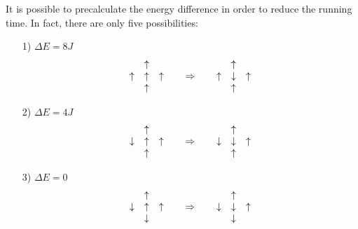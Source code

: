 \documentclass[%
preprint,
 amsmath,amssymb,
 aps,
]{revtex4-1}
\theoremstyle{plain}
\theoremstyle{definition}
\theoremstyle{plain}
\begin{document}
It is possible to precalculate the energy difference in order to reduce the running time. In fact, there are only five possibilities:
\begin{itemize}
\item[1)] $\Delta E=8J$
\[
\begin{array}{ccc}
 		& \uparrow & \\
\uparrow & \uparrow & \uparrow  \\
		   & \uparrow &  \\
\end{array}
\hspace{0.5cm}
\Rightarrow
\hspace{0.5cm}
\begin{array}{ccc}
 		& \uparrow & \\
\uparrow & \downarrow & \uparrow  \\
		   & \uparrow &  \\
\end{array}
\]
\item[2)] $\Delta E=4J$
\[
\begin{array}{ccc}
 		& \uparrow & \\
\downarrow & \uparrow & \uparrow  \\
		   & \uparrow &  \\
\end{array}
\hspace{0.5cm}
\Rightarrow
\hspace{0.5cm}
\begin{array}{ccc}
 		& \uparrow & \\
\downarrow & \downarrow & \uparrow  \\
		   & \uparrow &  \\
\end{array}
\]
\item[3)] $\Delta E=0$
\[
\begin{array}{ccc}
 		& \uparrow & \\
\downarrow & \uparrow & \uparrow  \\
		   & \downarrow &  \\
\end{array}
\hspace{0.5cm}
\Rightarrow
\hspace{0.5cm}
\begin{array}{ccc}
 		& \uparrow & \\
\downarrow & \downarrow & \uparrow  \\
		   & \downarrow &  \\
\end{array}
\]
\end{itemize}
\end{document}
